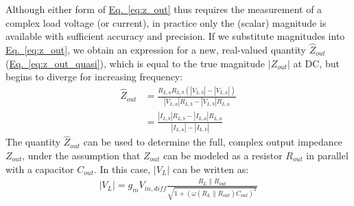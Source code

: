 \documentclass[10pt]{article}
\newcommand{\briefeqlink}[1]{\hyperref[#1]{Eq.~\ref*{#1}}\xspace }
\begin{document}
Although either form of \briefeqlink{eq:z_out} thus requires the measurement of a complex load voltage (or current), in practice only the (scalar) magnitude is available with sufficient accuracy and precision. If we substitute magnitudes into \briefeqlink{eq:z_out}, we obtain an expression for a new, real-valued quantity $\hat{Z}_{out}$ (\briefeqlink{eq:z_out_quasi}), which is equal to the true magnitude $|Z_{out}|$ at DC, but begins to diverge for increasing frequency:
\begin{subequations}
\label{eq:z_out_quasi}
\begin{align}
\hat{Z}_{out} &= \frac{R_{L,a} R_{L,b} (|V_{L,b}| - |V_{L,a}|)} {|V_{L,a}|R_{L,b} - |V_{L,b}| R_{L,a}} \label{eq:z_out_quasi_volt} \\
&= \frac{|I_{L,b}| R_{L,b} - |I_{L,a}| R_{L,a}} {|I_{L,a}| - |I_{L,b}|} \label{eq:z_out_quasi_curr}
\end{align}
\end{subequations}
The quantity $\hat{Z}_{out}$ can be used to determine the full, complex output impedance $Z_{out}$, under the assumption that $Z_{out}$ can be modeled as a resistor $R_{out}$ in parallel with a capacitor $C_{out}$. In this case, $|V_L|$ can be written as:
\begin{align}
|V_L| = g_m V_{in,dif\!f}\frac{R_L\|R_{out}} {\sqrt{1 + (\omega (R_L\|R_{out}) C_{out})^2}} \label{eq:v_l_for_ref_circuit}
\end{align}
\end{document}
